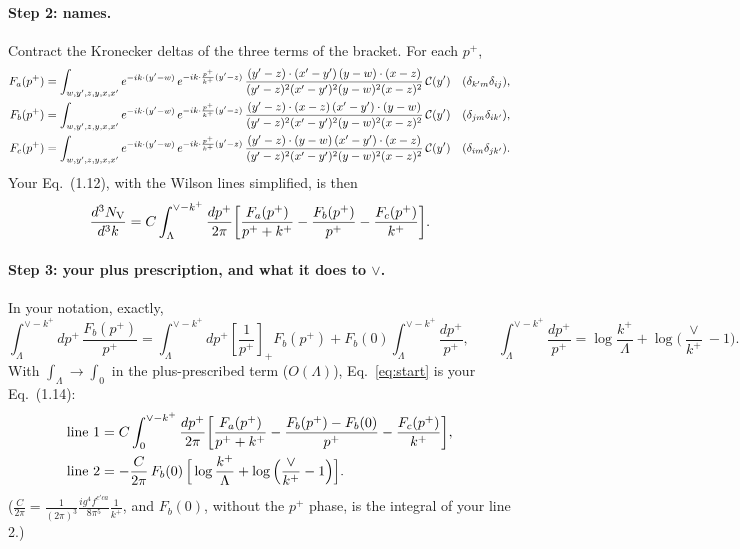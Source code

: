 \documentclass[10pt]{article}
\numberwithin{equation}{section}
\begin{document}
\paragraph{Step 2: names.} Contract the Kronecker deltas of the three terms of the bracket. For each $p^+$,
\begin{align}
F_a(p^+)&=\int_{w,y',z,y,x,x'}e^{-ik\cdot (y'-w)}\, e^{-ik\cdot \frac{p^{+}}{k^{+}}(y'-z)}\,\frac{(y'-z)\cdot (x'-y')\,(y-w)\cdot (x-z)}{(y'-z)^{2}(x'-y')^{2}(y-w)^{2}(x-z)^{2}}\,\mathcal C(y') &&(\delta_{k'm}\delta_{ij}),\notag\\
F_b(p^+)&=\int_{w,y',z,y,x,x'}e^{-ik\cdot (y'-w)}\, e^{-ik\cdot \frac{p^{+}}{k^{+}}(y'-z)}\,\frac{(y'-z)\cdot (x-z)\,(x'-y')\cdot (y-w)}{(y'-z)^{2}(x'-y')^{2}(y-w)^{2}(x-z)^{2}}\,\mathcal C(y') &&(\delta_{jm}\delta_{ik'}),\notag\\
F_c(p^+)&=\int_{w,y',z,y,x,x'}e^{-ik\cdot (y'-w)}\, e^{-ik\cdot \frac{p^{+}}{k^{+}}(y'-z)}\,\frac{(y'-z)\cdot (y-w)\,(x'-y')\cdot (x-z)}{(y'-z)^{2}(x'-y')^{2}(y-w)^{2}(x-z)^{2}}\,\mathcal C(y') &&(\delta_{im}\delta_{jk'}).
\label{eq:F}
\end{align}
Your Eq.~(1.12), with the Wilson lines simplified, is then
\begin{equation}
\frac{d^3N_{\rm V}}{d^3k}=C\int_{\Lambda}^{\vee-k^{+}}\frac{dp^{+}}{2\pi}\bigg[\frac{F_a(p^+)}{p^++k^+}-\frac{F_b(p^+)}{p^+}-\frac{F_c(p^+)}{k^+}\bigg].
\label{eq:start}
\end{equation}

\paragraph{Step 3: your plus prescription, and what it does to $\vee$.} In your notation, exactly,
\begin{equation}
\int_\Lambda^{\vee-k^+}dp^+\,\frac{F_b(p^+)}{p^+}=\int_\Lambda^{\vee-k^+}dp^+\left[\frac{1}{p^+}\right]_+F_b(p^+)+F_b(0)\int_\Lambda^{\vee-k^+}\frac{dp^+}{p^+},\qquad
\int_\Lambda^{\vee-k^+}\frac{dp^+}{p^+}=\log\frac{k^+}{\Lambda}+\log\Big(\frac{\vee}{k^+}-1\Big).
\label{eq:step3}
\end{equation}
With $\int_\Lambda\to\int_0$ in the plus-prescribed term ($O(\Lambda)$), Eq.~\eqref{eq:start} is your Eq.~(1.14):
\begin{align}
\text{line 1}&=C\int_{0}^{\vee-k^{+}}\frac{dp^{+}}{2\pi}\bigg[\frac{F_a(p^+)}{p^++k^+}-\frac{F_b(p^+)-F_b(0)}{p^+}-\frac{F_c(p^+)}{k^+}\bigg],\notag\\
\text{line 2}&=-\frac{C}{2\pi}\,F_b(0)\,\Big[\log\frac{k^+}{\Lambda}+\log\Big(\frac{\vee}{k^+}-1\Big)\Big].
\label{eq:lines}
\end{align}
($\frac{C}{2\pi}=\frac{1}{(2\pi)^3}\frac{ig^4f^{c'ca}}{8\pi^5}\frac{1}{k^+}$, and $F_b(0)$, without the $p^+$ phase, is the integral of your line 2.)
\end{document}
